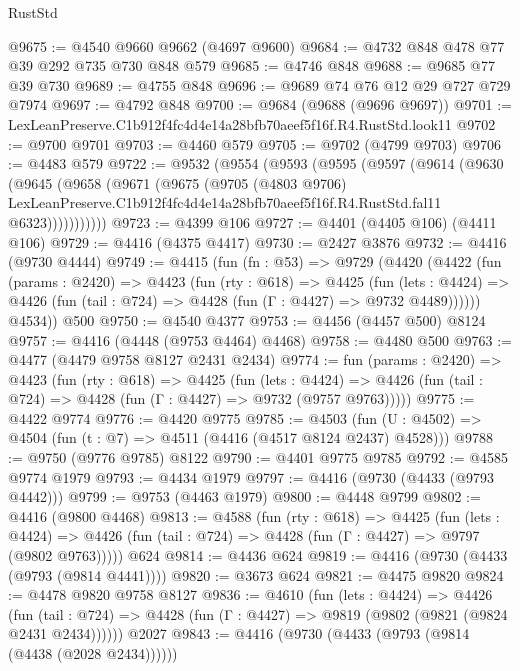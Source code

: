 \begin{lexlean}{RustStd}
\begin{coremodule}
@9675 := @4540 @9660 @9662 (@4697 @9600)
@9684 := @4732 @848 @478 @77 @39 @292 @735 @730 @848 @579
@9685 := @4746 @848
@9688 := @9685 @77 @39 @730
@9689 := @4755 @848
@9696 := @9689 @74 @76 @12 @29 @727 @729 @7974
@9697 := @4792 @848
@9700 := @9684 (@9688 (@9696 @9697))
@9701 := LexLeanPreserve.C1b912f4fc4d4e14a28bfb70aeef5f16f.R4.RustStd.look11
@9702 := @9700 @9701
@9703 := @4460 @579
@9705 := @9702 (@4799 @9703)
@9706 := @4483 @579
@9722 := @9532
    (@9554
      (@9593
        (@9595
          (@9597
            (@9614
              (@9630
                (@9645
                  (@9658
                    (@9671
                      (@9675
                        (@9705
                          (@4803 @9706)
                          LexLeanPreserve.C1b912f4fc4d4e14a28bfb70aeef5f16f.R4.RustStd.fal11
                          @6323)))))))))))
@9723 := @4399 @106
@9727 := @4401 (@4405 @106) (@4411 @106)
@9729 := @4416 (@4375 @4417)
@9730 := @2427 @3876
@9732 := @4416 (@9730 @4444)
@9749 := @4415
    (fun (fn : @53) =>
    @9729
      (@4420
        (@4422
          (fun (params : @2420) =>
          @4423
            (fun (rty : @618) =>
            @4425
              (fun (lets : @4424) =>
              @4426 (fun (tail : @724) => @4428 (fun (Γ : @4427) => @9732 @4489))))))
        @4534))
    @500
@9750 := @4540 @4377
@9753 := @4456 (@4457 @500) @8124
@9757 := @4416 (@4448 (@9753 @4464) @4468)
@9758 := @4480 @500
@9763 := @4477 (@4479 @9758 @8127 @2431 @2434)
@9774 := fun (params : @2420) =>
  @4423
    (fun (rty : @618) =>
    @4425
      (fun (lets : @4424) =>
      @4426 (fun (tail : @724) => @4428 (fun (Γ : @4427) => @9732 (@9757 @9763)))))
@9775 := @4422 @9774
@9776 := @4420 @9775
@9785 := @4503 (fun (U : @4502) => @4504 (fun (t : @7) => @4511 (@4416 (@4517 @8124 @2437) @4528)))
@9788 := @9750 (@9776 @9785) @8122
@9790 := @4401 @9775 @9785
@9792 := @4585 @9774 @1979
@9793 := @4434 @1979
@9797 := @4416 (@9730 (@4433 (@9793 @4442)))
@9799 := @9753 (@4463 @1979)
@9800 := @4448 @9799
@9802 := @4416 (@9800 @4468)
@9813 := @4588
    (fun (rty : @618) =>
    @4425
      (fun (lets : @4424) =>
      @4426 (fun (tail : @724) => @4428 (fun (Γ : @4427) => @9797 (@9802 @9763)))))
    @624
@9814 := @4436 @624
@9819 := @4416 (@9730 (@4433 (@9793 (@9814 @4441))))
@9820 := @3673 @624
@9821 := @4475 @9820
@9824 := @4478 @9820 @9758 @8127
@9836 := @4610
    (fun (lets : @4424) =>
    @4426
      (fun (tail : @724) => @4428 (fun (Γ : @4427) => @9819 (@9802 (@9821 (@9824 @2431 @2434))))))
    @2027
@9843 := @4416 (@9730 (@4433 (@9793 (@9814 (@4438 (@2028 @2434))))))

\end{coremodule}
\end{lexlean}
